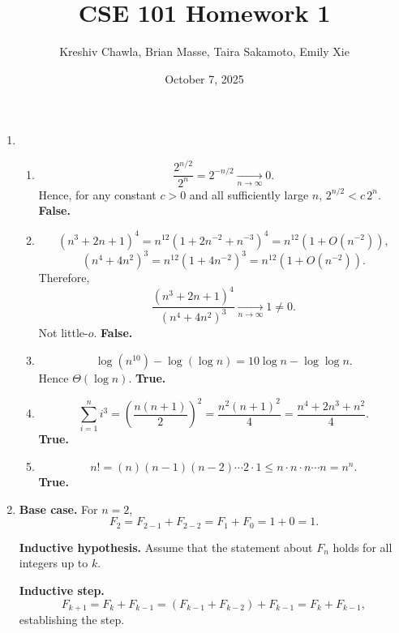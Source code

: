 \documentclass[12pt, letterpaper]{article}
\title{CSE 101 Homework 1}
\author{Kreshiv Chawla, Brian Masse, Taira Sakamoto, Emily Xie}
\date{October 7, 2025}
\begin{document}
\maketitle
\newpage

\begin{enumerate}

\item
\begin{enumerate}
  \item 
  \[
    \frac{2^{n/2}}{2^n} = 2^{-n/2} \xrightarrow[n \to \infty]{} 0.
  \]
  Hence, for any constant $c > 0$ and all sufficiently large $n$, 
  $2^{n/2} < c \, 2^n$. \textbf{False.}

  \item
  \[
    (n^3 + 2n + 1)^4 
      = n^{12} \! \left(1 + 2n^{-2} + n^{-3}\right)^4
      = n^{12} \! \left(1 + O(n^{-2})\right),
  \]
  \[
    (n^4 + 4n^2)^3
      = n^{12} \! \left(1 + 4n^{-2}\right)^3
      = n^{12} \! \left(1 + O(n^{-2})\right).
  \]
  Therefore,
  \[
    \frac{(n^3 + 2n + 1)^4}{(n^4 + 4n^2)^3}
      \xrightarrow[n \to \infty]{} 1 \neq 0.
  \]
  Not little-$o$. \textbf{False.}

  \item
  \[
    \log\!\left(n^{10}\right) - \log(\log n)
      = 10 \log n - \log \log n.
  \]
  Hence $\Theta(\log n)$. \textbf{True.}

  \item
  \[
    \sum_{i=1}^{n} i^{3}
      = \left(\frac{n(n+1)}{2}\right)^{2}
      = \frac{n^2 (n+1)^2}{4}
      = \frac{n^4 + 2n^3 + n^2}{4}.
  \]
  \textbf{True.}

  \item
  \[
    n! = (n)(n-1)(n-2)\cdots 2 \cdot 1
      \le n \cdot n \cdot n \cdots n = n^n.
  \]
  \textbf{True.}
\end{enumerate}

\item
\textbf{Base case.} For $n = 2$,
\[
  F_2 = F_{2-1} + F_{2-2} = F_1 + F_0 = 1 + 0 = 1.
\]

\textbf{Inductive hypothesis.} Assume that the statement about $F_n$
holds for all integers up to $k$.

\textbf{Inductive step.}
\[
  F_{k+1}
    = F_k + F_{k-1}
    = (F_{k-1} + F_{k-2}) + F_{k-1}
    = F_k + F_{k-1},
\]
establishing the step.


\end{enumerate}
\end{document}
